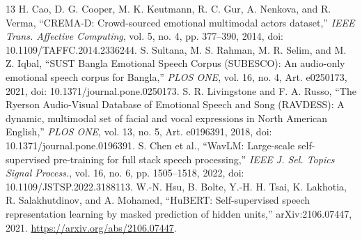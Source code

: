 \documentclass[letterpaper]{article}
\begin{document}
\begin{thebibliography}{13}
 H. Cao, D. G. Cooper, M. K. Keutmann, R. C. Gur, A. Nenkova, and R. Verma, ``CREMA-D: Crowd-sourced emotional multimodal actors dataset,'' \emph{IEEE Trans. Affective Computing}, vol. 5, no. 4, pp. 377--390, 2014, doi: 10.1109/TAFFC.2014.2336244.
 S. Sultana, M. S. Rahman, M. R. Selim, and M. Z. Iqbal, ``SUST Bangla Emotional Speech Corpus (SUBESCO): An audio-only emotional speech corpus for Bangla,'' \emph{PLOS ONE}, vol. 16, no. 4, Art. e0250173, 2021, doi: 10.1371/journal.pone.0250173.
 S. R. Livingstone and F. A. Russo, ``The Ryerson Audio-Visual Database of Emotional Speech and Song (RAVDESS): A dynamic, multimodal set of facial and vocal expressions in North American English,'' \emph{PLOS ONE}, vol. 13, no. 5, Art. e0196391, 2018, doi: 10.1371/journal.pone.0196391.
 S. Chen et al., ``WavLM: Large-scale self-supervised pre-training for full stack speech processing,'' \emph{IEEE J. Sel. Topics Signal Process.}, vol. 16, no. 6, pp. 1505--1518, 2022, doi: 10.1109/JSTSP.2022.3188113.
 W.-N. Hsu, B. Bolte, Y.-H. H. Tsai, K. Lakhotia, R. Salakhutdinov, and A. Mohamed, ``HuBERT: Self-supervised speech representation learning by masked prediction of hidden units,'' arXiv:2106.07447, 2021. \url{https://arxiv.org/abs/2106.07447}.
\end{thebibliography}
\end{document}
